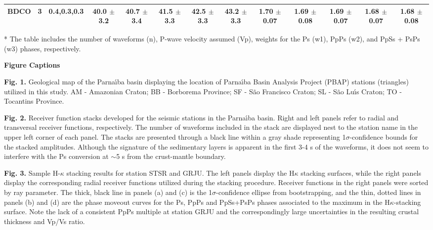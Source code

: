\documentclass[manuscript,11pt]{geophysics}
\begin{document}
\begin{landscape}
\begin{table}[! htpb]
\begin{threeparttable}
\begin{tabular}{ccc|ccccc|ccccc}
BDCO & 3 & 0.4,0.3,0.3 & 40.0 $\pm$ 3.2 & 40.7 $\pm$ 3.4 & 41.5 $\pm$ 3.3 & 42.5 $\pm$ 3.3 & 43.2 $\pm$ 3.3  & 1.70 $\pm$ 0.07 & 1.69 $\pm$ 0.08 & 1.69 $\pm$ 0.07 & 1.68 $\pm$ 0.07 & 1.68 $\pm$ 0.08 \\ \hline
\end{tabular}
	\begin{tablenotes}\footnotesize
	\item[*] The table includes the number of waveforms (n), P-wave velocity assumed (Vp), weights for the Ps (w1), PpPs (w2), and PpSs + PsPs (w3) phases, respectively.
    \end{tablenotes}
    \label{tabela_hk_stacking}
	\end{threeparttable}
\end{table}
\end{landscape}


\pagebreak
\begin{flushleft}
\textbf{\LARGE Figure Captions}
\end{flushleft}

\textbf{Fig. 1.} Geological map of the Parna\'{\i}ba basin displaying the location of Parna\'{\i}ba Basin Analysis Project (PBAP) stations (triangles) utilized in this study. AM - Amazonian Craton; BB - Borborema Province; SF - S\~ao Francisco Craton; SL - S\~ao Lu\'{\i}s Craton; TO - Tocantins Province.

\textbf{Fig. 2.} Receiver function stacks developed for the seismic stations in the Parna\'{\i}ba basin. Right and left panels refer to radial and transversal receiver functions, respectively. The number of waveforms included in the stack are displayed nest to the station name in the upper left corner of each panel. The stacks are presented through a black line within a gray shade representing 1$\sigma$-confidence bounds for the stacked amplitudes. Although the signature of the sedimentary layers is apparent in the first 3-4 s of the waveforms, it does not seem to interfere with the Ps conversion at $\sim$5 s from the crust-mantle boundary. 

\textbf{Fig. 3.} Sample H-$\kappa$ stacking results for station STSR and GRJU. The left panels display the H$\kappa$ stacking surfaces, while the right panels display the corresponding radial receiver functions utilized during the stacking procedure. Receiver functions in the right panels were sorted by ray parameter. The thick, black line in panels (a) and (c) is the 1$\sigma$-confidence ellipse from bootstrapping, and the thin, dotted lines in panels (b) and (d) are the phase moveout curves for the Ps, PpPs and PpSs+PsPs phases associated to the maximum in the H$\kappa$-stacking surface. Note the lack of a consistent PpPs multiple at station GRJU and the correspondingly large uncertainties in the resulting crustal thickness and Vp/Vs ratio.
\end{document}
